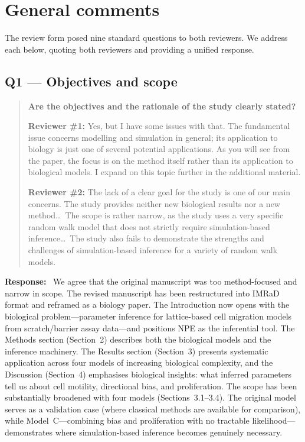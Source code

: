 \documentclass[11pt,a4paper]{article}
\newenvironment{reviewercomment}{%
  \begin{quote}\itshape\color{reviewerblue}%
}{%
  \end{quote}%
}
\newcommand{\response}{\textbf{Response:}~}
\begin{document}
\section*{General comments}

\noindent
The review form posed nine standard questions to both reviewers. We address each below, quoting both reviewers and providing a unified response.


\subsection*{Q1 --- Objectives and scope}

\begin{reviewercomment}
\textbf{Are the objectives and the rationale of the study clearly stated?}

\textbf{Reviewer \#1:} Yes, but I have some issues with that. The fundamental issue concerns modelling and simulation in general; its application to biology is just one of several potential applications. As you will see from the paper, the focus is on the method itself rather than its application to biological models. I expand on this topic further in the additional material.

\textbf{Reviewer \#2:} The lack of a clear goal for the study is one of our main concerns. The study provides neither new biological results nor a new method\ldots\ The scope is rather narrow, as the study uses a very specific random walk model that does not strictly require simulation-based inference\ldots\ The study also fails to demonstrate the strengths and challenges of simulation-based inference for a variety of random walk models.
\end{reviewercomment}

\response
We agree that the original manuscript was too method-focused and narrow in scope. The revised manuscript has been restructured into IMRaD format and reframed as a biology paper. The Introduction now opens with the biological problem---parameter inference for lattice-based cell migration models from scratch/barrier assay data---and positions NPE as the inferential tool. The Methods section (Section~2) describes both the biological models and the inference machinery. The Results section (Section~3) presents systematic application across four models of increasing biological complexity, and the Discussion (Section~4) emphasises biological insights: what inferred parameters tell us about cell motility, directional bias, and proliferation. The scope has been substantially broadened with four models (Sections~3.1--3.4). The original model serves as a validation case (where classical methods are available for comparison), while Model~C---combining bias and proliferation with no tractable likelihood---demonstrates where simulation-based inference becomes genuinely necessary.
\end{document}
